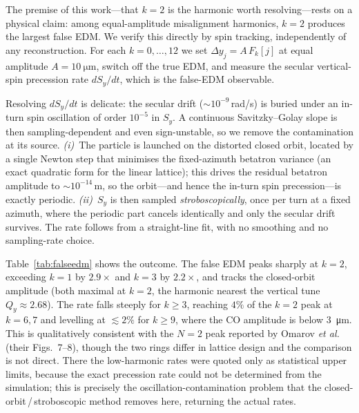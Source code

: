 \documentclass[preprint,12pt]{elsarticle}
\begin{document}
The premise of this work---that $k=2$ is the harmonic worth resolving---rests
on a physical claim: among equal-amplitude misalignment harmonics, $k=2$
produces the largest false EDM. We verify this directly by spin tracking,
independently of any reconstruction. For each $k=0,\dots,12$ we set
$\Delta y_j=A\,F_k[j]$ at equal amplitude $A=\SI{10}{\micro\meter}$, switch
off the true EDM, and measure the secular vertical-spin precession rate
$dS_y/dt$, which is the false-EDM observable.

Resolving $dS_y/dt$ is delicate: the secular drift ($\sim\!10^{-9}$\,rad/s)
is buried under an in-turn spin oscillation of order $10^{-5}$ in $S_y$.
A continuous Savitzky--Golay slope is then sampling-dependent and even
sign-unstable, so we remove the contamination at its source.
\emph{(i)}~The particle is launched on the distorted closed orbit, located
by a single Newton step that minimises the fixed-azimuth betatron variance
(an exact quadratic form for the linear lattice); this drives the residual
betatron amplitude to $\sim\!10^{-14}$\,m, so the orbit---and hence the
in-turn spin precession---is exactly periodic. \emph{(ii)}~$S_y$ is then
sampled \emph{stroboscopically}, once per turn at a fixed azimuth, where the
periodic part cancels identically and only the secular drift survives. The
rate follows from a straight-line fit, with no smoothing and no
sampling-rate choice.

Table~\ref{tab:falseedm} shows the outcome. The false EDM peaks sharply at
$k=2$, exceeding $k=1$ by $2.9\times$ and $k=3$ by $2.2\times$, and tracks
the closed-orbit amplitude (both maximal at $k=2$, the harmonic nearest the
vertical tune $Q_y\approx2.68$). The rate falls steeply for $k\ge3$,
reaching $4\%$ of the $k=2$ peak at $k=6{,}7$ and levelling at
$\lesssim\!2\%$ for $k\ge9$, where the CO amplitude is below
\SI{3}{\micro\meter}. This is qualitatively consistent with the
$N=2$ peak reported by Omarov \emph{et al.}~\cite{omarov} (their
Figs.~7--8), though the two rings differ in lattice design and the
comparison is not direct. There the low-harmonic rates were quoted only as
statistical upper limits, because the exact precession rate could not be
determined from the simulation; this is precisely the
oscillation-contamination problem that the closed-orbit\,/\,stroboscopic
method removes here, returning the actual rates.
\end{document}
